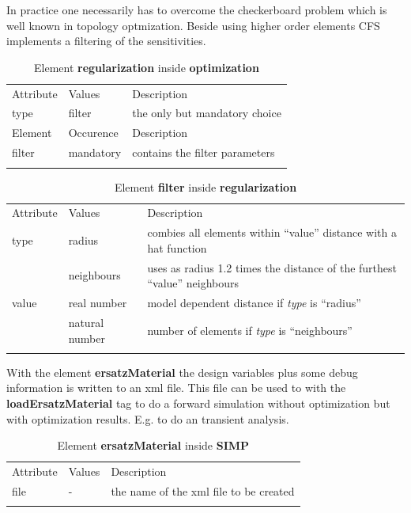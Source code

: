 In practice one necessarily has to overcome the checkerboard problem which is well known 
in topology optmization. Beside using higher order elements CFS implements a filtering of the
sensitivities. 

\begin{center}
\begin{longtable}{llp{}}
\hline\noalign{\smallskip}
Attribute & Values & Description \\
\noalign{\smallskip}\hline\noalign{\smallskip}
type     & filter & the only but mandatory choice \\
\noalign{\smallskip}\hline\noalign{\smallskip}
Element & Occurence & Description \\
\noalign{\smallskip}\hline\noalign{\smallskip}
filter & mandatory & contains the filter parameters \\
\noalign{\smallskip}\hline\noalign{\smallskip} 
\caption{Element \textbf{regularization} inside \textbf{optimization}}
\end{longtable}
\end{center} 

\begin{center}
\begin{longtable}{llp{}}
\hline\noalign{\smallskip}
Attribute & Values & Description \\
\noalign{\smallskip}\hline\noalign{\smallskip}
type     & radius  & combies all elements within ``value'' distance with a hat function \\
         & neighbours  & uses as radius 1.2 times the distance of the furthest ``value'' neighbours \\
value    & real number & model dependent distance if \textsl{type} is ``radius'' \\
         & natural number & number of elements if \textsl{type} is ``neighbours'' \\
\noalign{\smallskip}\hline\noalign{\smallskip}
\caption{Element \textbf{filter} inside \textbf{regularization}}
\end{longtable}
\end{center} 

With the element \textbf{ersatzMaterial} the design variables plus some debug information is
written to an xml file. This file can be used to with the \textbf{loadErsatzMaterial} tag to do a forward simulation without optimization but with optimization results. E.g. to do an transient 
analysis.

\begin{center}
\begin{longtable}{llp{}}
\hline\noalign{\smallskip}
Attribute & Values & Description \\
\noalign{\smallskip}\hline\noalign{\smallskip}
file     & -  & the name of the xml file to be created \\
\noalign{\smallskip}\hline\noalign{\smallskip}
\caption{Element \textbf{ersatzMaterial} inside \textbf{SIMP}}
\end{longtable}
\end{center} 

